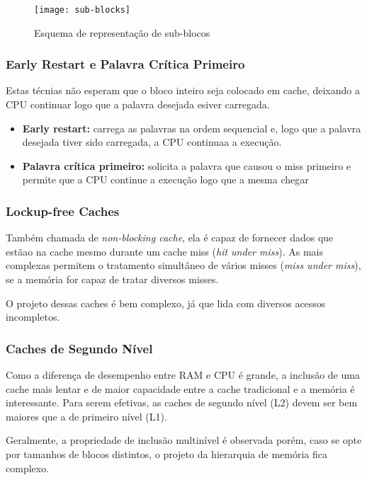 \begin{figure}[ht]
  \centering
  \texttt{[image: sub-blocks]}
  \label{fig:sub-blocks}
  \caption{Esquema de representação de sub-blocos}
\end{figure}



\subsubsection{Early Restart e Palavra Crítica Primeiro}
Estas técnias não esperam que o bloco inteiro seja colocado em cache, deixando a CPU continuar logo que a palavra desejada esiver carregada.

\begin{itemize}
  \item \textbf{Early restart:} carrega as palavras na ordem sequencial e, logo que a palavra desejada tiver sido carregada, a CPU continuaa a execução.

  \item \textbf{Palavra crítica primeiro:} solicita a palavra que causou o miss primeiro e permite que a CPU continue a execução logo que a mesma chegar
\end{itemize}



\subsubsection{Lockup-free Caches}
Também chamada de \textit{non-blocking cache}, ela é capaz de fornecer dados que estãao na cache mesmo durante um cache miss (\textit{hit under miss}). As mais complexas permitem o tratamento simultâneo de vários misses (\textit{miss under miss}), se a memória for capaz de tratar diversos misses.

O projeto dessas caches é bem complexo, já que lida com diversos acessos incompletos.



\subsubsection{Caches de Segundo Nível}
Como a diferença de desempenho entre RAM e CPU é grande, a inclusão de uma cache mais lentar e de maior capacidade entre a cache tradicional e a memória é interessante. Para serem efetivas, as caches de segundo nível (L2) devem ser bem maiores que a de primeiro nível (L1).

Geralmente, a propriedade de inclusão multinível é observada porém, caso se opte por tamanhos de blocos distintos, o projeto da hierarquia de memória fica complexo.






